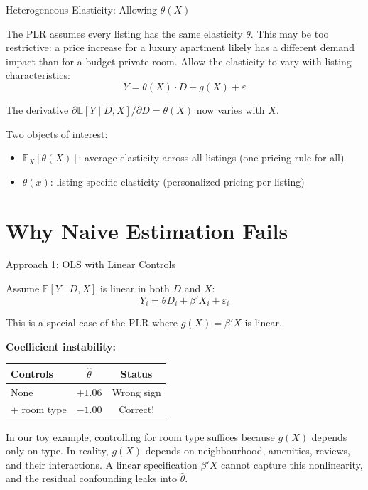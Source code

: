 \documentclass[aspectratio=169, 11pt]{beamer}
\newcommand{\E}{\mathbb{E}}
\begin{document}
\begin{frame}{Heterogeneous Elasticity: Allowing $\theta(X)$}

The PLR assumes every listing has the same elasticity $\theta$. This may be too restrictive: a price increase for a luxury apartment likely has a different demand impact than for a budget private room. Allow the elasticity to vary with listing characteristics:
\[
Y = \theta(X) \cdot D + g(X) + \varepsilon
\]

The derivative $\partial \E[Y \mid D, X] / \partial D = \theta(X)$ now varies with $X$.

\bigskip
\pause

Two objects of interest:
\begin{itemize}
    \item $\E_X[\theta(X)]$: average elasticity across all listings (one pricing rule for all)
    \item $\theta(x)$: listing-specific elasticity (personalized pricing per listing)
\end{itemize}

\end{frame}




\section{Why Naive Estimation Fails}

\begin{frame}{Approach 1: OLS with Linear Controls}

Assume $\E[Y \mid D, X]$ is linear in both $D$ and $X$:
\[
Y_i = \theta D_i + \beta' X_i + \varepsilon_i
\]

This is a special case of the PLR where $g(X) = \beta'X$ is linear.

\bigskip
\pause

\textbf{Coefficient instability:}

\begin{center}
\small
\begin{tabular}{lcc}
\toprule
\textbf{Controls} & $\hat{\theta}$ & \textbf{Status} \\
\midrule
None                        & $+1.06$ & \textcolor{warnred}{Wrong sign} \\
$+$ room type               & $-1.00$ & \textcolor{noteblue}{Correct!} \\
\bottomrule
\end{tabular}
\end{center}

\bigskip
\pause

In our toy example, controlling for room type suffices because $g(X)$ depends only on type. In reality, $g(X)$ depends on neighbourhood, amenities, reviews, and their interactions. A linear specification $\beta'X$ cannot capture this nonlinearity, and the residual confounding leaks into $\hat{\theta}$.

\end{frame}
\end{document}
